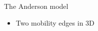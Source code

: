 \documentclass[1pt]{beamer}
\begin{document}
\begin{frame}{The Anderson model}


\begin{itemize}
	\centering \item Two mobility edges in 3D
\end{itemize}
\begin{figure}
\end{figure}
\end{frame}
\end{document}
